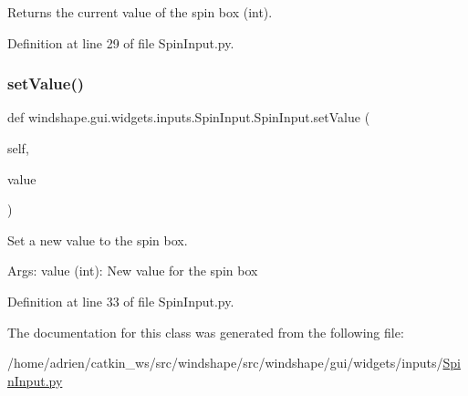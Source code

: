 \begin{DoxyVerb}Returns the current value of the spin box (int).\end{DoxyVerb}
 

Definition at line 29 of file Spin\+Input.\+py.

\mbox{\label{classwindshape_1_1gui_1_1widgets_1_1inputs_1_1_spin_input_1_1_spin_input_aaebdff1c9ac2ab2a7daad81c0e0348fa}} 
\subsubsection{\texorpdfstring{set\+Value()}{setValue()}}
{\footnotesize\ttfamily def windshape.\+gui.\+widgets.\+inputs.\+Spin\+Input.\+Spin\+Input.\+set\+Value (\begin{DoxyParamCaption}\item[{}]{self,  }\item[{}]{value }\end{DoxyParamCaption})}

\begin{DoxyVerb}Set a new value to the spin box.

Args:
    value (int): New value for the spin box
\end{DoxyVerb}
 

Definition at line 33 of file Spin\+Input.\+py.



The documentation for this class was generated from the following file\+:\begin{DoxyCompactItemize}
\item 
/home/adrien/catkin\+\_\+ws/src/windshape/src/windshape/gui/widgets/inputs/\mbox{\hyperlink{_spin_input_8py}{Spin\+Input.\+py}}\end{DoxyCompactItemize}
